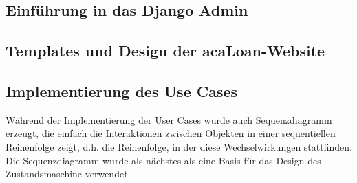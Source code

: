 \subsection{Einführung in das Django Admin}
\label{sec:server:admin}

\subsection{Templates und Design der acaLoan-Website}
\label{sec:server:design}

\subsection{Implementierung des Use Cases}
\label{sec:server:fsm}
Während der Implementierung der User Cases wurde auch Sequenzdiagramm erzeugt, die einfach die Interaktionen zwischen Objekten in einer sequentiellen Reihenfolge zeigt, d.h. die Reihenfolge, in der diese Wechselwirkungen stattfinden. Die Sequenzdiagramm wurde als nächstes als eine Basis für das Design des Zustandsmaschine verwendet.  

